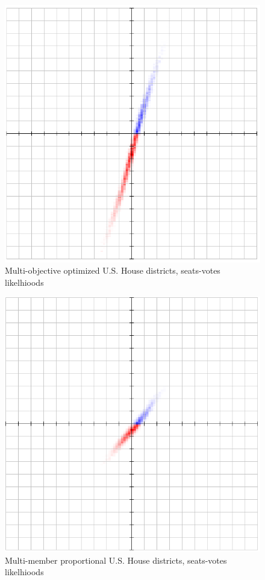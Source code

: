 \documentclass[preprint,12pt]{article}
\begin{document}
\begin{figure}[htb!]
    \begin{center}
        \includegraphics[scale=0.5]{Figures/original_method/SM__ush.png}
        \caption{Multi-objective optimized U.S. House districts, seats-votes likelhioods}\label{fig:SM_ush}
    \end{center}
\end{figure}
\begin{figure}[htb!]
    \begin{center}
        \includegraphics[scale=0.5]{Figures/original_method/FV_droop_ush.png}
        \caption{Multi-member proportional U.S. House districts, seats-votes likelhioods}\label{fig:FV_ush}
    \end{center}
\end{figure}
\end{document}
